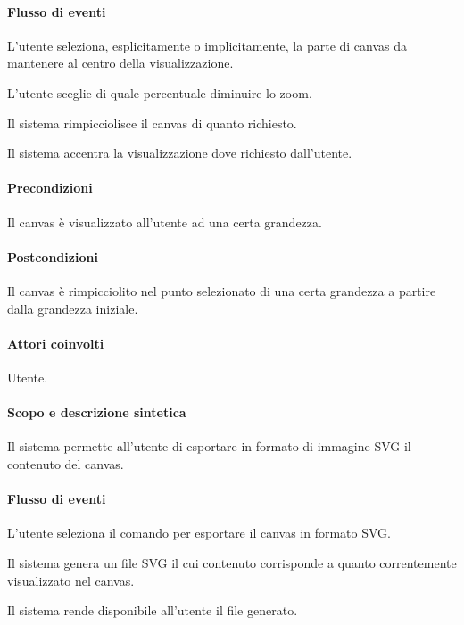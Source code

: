 \paragraph{Flusso di eventi}
\begin{elenconumerato}[\textbf{}]{\subsubsecindent}
\item L'utente seleziona, esplicitamente o implicitamente, la parte di canvas da mantenere al centro della visualizzazione.
\item L'utente sceglie di quale percentuale diminuire lo zoom.
\item Il sistema rimpicciolisce il canvas di quanto richiesto.
\item Il sistema accentra la visualizzazione dove richiesto dall'utente.
\end{elenconumerato}
\paragraph{Precondizioni} Il canvas \`e visualizzato all'utente ad una certa grandezza.
\paragraph{Postcondizioni} Il canvas \`e rimpicciolito nel punto selezionato di una certa grandezza a partire dalla grandezza iniziale.

\paragraph{Attori coinvolti} Utente.
\paragraph{Scopo e descrizione sintetica} 
Il sistema permette all'utente di esportare in formato di immagine SVG il contenuto del canvas.
\paragraph{Flusso di eventi}
\begin{elenconumerato}[\textbf{}]{\subsubsecindent}
\item L'utente seleziona il comando per esportare il canvas in formato SVG.
\item Il sistema genera un file SVG il cui contenuto corrisponde a quanto correntemente visualizzato nel canvas.
\item Il sistema rende disponibile all'utente il file generato.
\end{elenconumerato}
